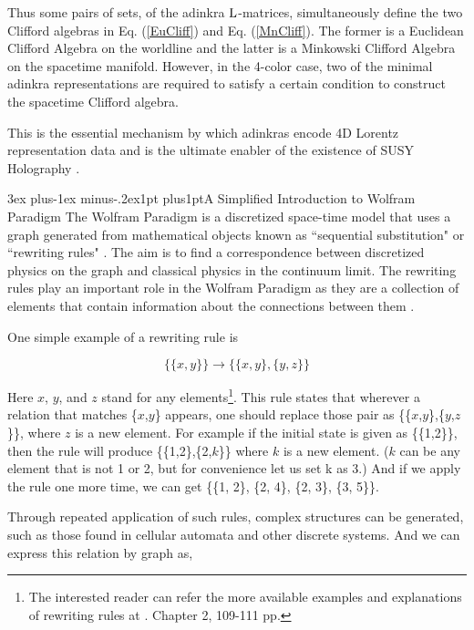 \documentclass[12pt]{article}
\makeatletter
\let\bm\relax
\newcommand{\bm}[1]{{\boldsymbol{#1}}}
\def\section{\@startsection{section}{1}{\z@}
        {3ex plus-1ex minus-.2ex}{1pt plus1pt}{\large\sf\bfseries\boldmath}}
\makeatother
\begin{document}
Thus some pairs of sets, of the adinkra $\bm {\rm L}$-matrices, simultaneously define the two
Clifford algebras in Eq. (\ref{EuCliff}) and Eq. (\ref{MnCliff}). The former is a Euclidean Clifford 
Algebra on the worldline and the latter is a Minkowski Clifford Algebra on the spacetime manifold.  
However, in the 4-color case, two of the minimal adinkra representations are required to satisfy a 
certain condition \cite{Spn+ChLR} to construct the spacetime Clifford algebra.

This is the essential mechanism by which adinkras encode 4D Lorentz representation data and is the 
ultimate enabler of the existence of SUSY Holography \cite{4}.

\newpage 
\section{A Simplified Introduction to Wolfram Paradigm}
The Wolfram Paradigm is a discretized space-time model that uses a graph generated from mathematical objects known as ``sequential substitution" or ``rewriting rules" \cite{18}. 
The aim is to find a correspondence between discretized physics on the graph and classical physics in the continuum limit. The rewriting rules play an important role in the Wolfram Paradigm as they are a collection of elements that contain information about the connections between them \cite{17}. 

One simple example of a rewriting rule is

\begin{equation}
\{\{x, y\}\} \rightarrow \{\{x, y\}, \{y, z\}\}
\end{equation}

Here $x$, $y$, and $z$ stand for any elements\footnote{The interested reader can refer the more available examples and explanations of rewriting rules at \cite{17}. Chapter 2, 109-111 pp.}. This rule states that wherever a relation that matches \{$x$,$y$\} appears, one should replace those pair as \{\{$x$,$y$\},\{$y$,$z$\}\}, where $z$ is a new element. 
For example if the initial state is given as \{\{1,2\}\}, then the rule will produce \{\{1,2\},\{2,$k$\}\} where $k$ is a new element. ($k$ can be any element that is not 1 or 2, but for convenience let us set k as 3.)
And if we apply the rule one more time, we can get \{\{1, 2\}, \{2, 4\}, \{2, 3\}, \{3, 5\}\}.

Through repeated application of such rules, complex structures can be generated, such as those found in cellular automata and other discrete systems.
And we can express this relation by graph as,
\end{document}
